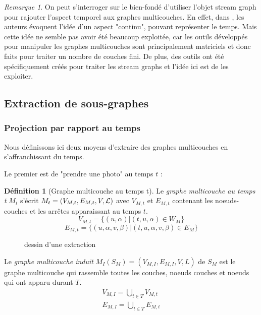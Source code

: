 \documentclass[11pt,a4paper]{article}
\theoremstyle{definition}
\newtheorem{defn}{Définition}
\theoremstyle{remark}
\newtheorem{rmq}{Remarque}
\theoremstyle{remark}
\begin{document}
	\begin{rmq}
		On peut s'interroger sur le bien-fondé d'utiliser l'objet stream graph pour rajouter l'aspect temporel aux graphes multicouches. En effet, dans \cite{mlkiv}, les auteurs évoquent l'idée d'un aspect "continu", pouvant représenter le temps. Mais cette idée ne semble pas avoir été beaucoup exploitée, car les outils développés pour manipuler les graphes multicouches sont principalement matriciels et donc faits pour traiter un nombre de couches fini. De plus, des outils ont été spécifiquement créés pour traiter les stream graphs et l'idée ici est de les exploiter.
	
	\end{rmq}

\subsection{Extraction de sous-graphes}

\subsubsection{Projection par rapport au temps}
	Nous définissons ici deux moyens d'extraire des graphes multicouches en s'affranchissant du temps.
	
	Le premier est de "prendre une photo" au temps $t$ :
	\begin{defn}[Graphe multicouche au temps t]
   	Le {\em graphe multicouche au temps t} $M_t$ s'écrit $M_t = (V_{M,t}, E_{M,t},V,{\cal L})$ avec $V_{M,t}$ et $E_{M,t}$ contenant les noeuds-couches et les arrêtes apparaissant au temps $t$.
   	$$ V_{M,t} = \{ (u,\alpha) | (t,u,\alpha) \in W_M\} $$
   	$$ E_{M,t} = \{(u,\alpha,v,\beta) | (t,u,\alpha,v,\beta) \in E_M\}$$

   \end{defn}

	\begin{figure}[h]
		\begin{minipage}{0.49\linewidth}
		\end{minipage}
		\begin{minipage}{0.49\linewidth}
		\end{minipage}
		\caption{dessin d'une extraction}
	\end{figure}

    
    Le {\em graphe multicouche induit} $M_I(S_M) = (V_{M,I}, E_{M,I}, V,L)$ de $S_M$ est le graphe multicouche qui rassemble toutes les couches, noeuds couches et noeuds qui ont apparu durant $T$.
    \begin{align*}
    	V_{M,I} = \bigcup_{t\in T} V_{M,t}\\
    	E_{M,I} = \bigcup_{t\in T} E_{M,t}\\
    \end{align*}
    
\end{document}
